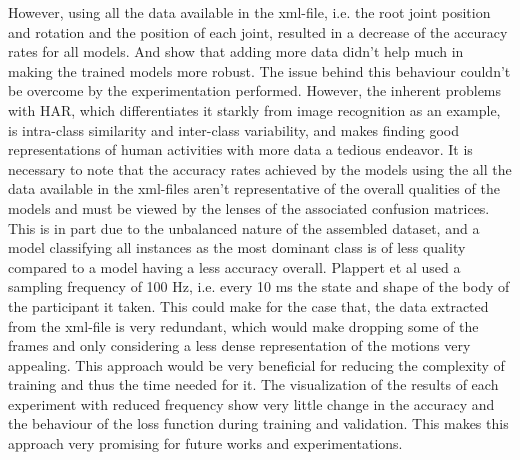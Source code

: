 		However, using all the data available in the xml-file, i.e. the root joint position and rotation and the position of each joint, resulted in a decrease of the accuracy rates for all models. And show that adding more data didn't help much in making the trained models more robust. The issue behind this behaviour couldn't be overcome by the experimentation performed. However, the inherent problems with HAR, which differentiates it starkly from image recognition as an example, is intra-class similarity and inter-class variability, and makes finding good representations of human activities with more data a tedious endeavor. It is necessary to note that the accuracy rates achieved by the models using the all the data available in the xml-files aren't representative of the overall qualities of the models and must be viewed by the lenses of the associated confusion matrices. This is in part due to the unbalanced nature of the assembled dataset, and a model classifying all instances as the most dominant class is of less quality compared to a model having a less accuracy overall.\newline
		Plappert et al used a sampling frequency of 100 Hz, i.e. every 10 ms the state and shape of the body of the participant it taken\cite{Plappert2016}. This could make for the case that, the data extracted from the xml-file is very redundant, which would make dropping some of the frames and only considering a less dense representation of the motions very appealing. This approach would be very beneficial for reducing the complexity of training and thus the time needed for it. The visualization of the results of each experiment with reduced frequency show very little change in the accuracy and the behaviour of the loss function during training and validation. This makes this approach very promising for future works and experimentations.
